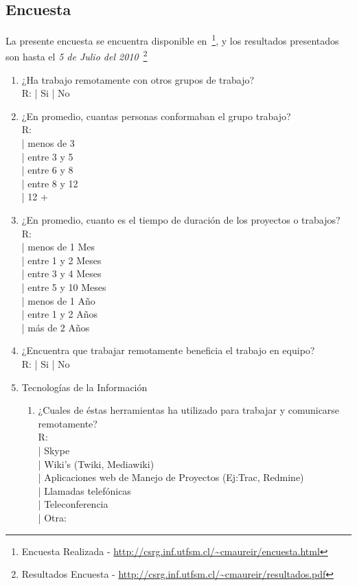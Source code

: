 \subsection{Encuesta}
La presente encuesta se encuentra disponible en~\footnote{Encuesta Realizada - \url{http://csrg.inf.utfsm.cl/~cmaureir/encuesta.html}},
y los resultados presentados son hasta el \emph{5 de Julio del 2010}~\footnote{Resultados Encuesta - \url{http://csrg.inf.utfsm.cl/~cmaureir/resultados.pdf}}
\begin{enumerate}
    \item ¿Ha trabajo remotamente con otros grupos de trabajo?\\
        R: | Si | No
    \item ¿En promedio, cuantas personas conformaban el grupo trabajo?\\
        R:\\
            | menos de 3\\
            | entre 3 y 5\\
            | entre 6 y 8\\
            | entre 8 y 12\\
            | 12 +
    \item ¿En promedio, cuanto es el tiempo de duración de los
    proyectos o trabajos?\\
        R:\\
            | menos de 1 Mes\\
            | entre 1 y 2 Meses\\
            | entre 3 y 4 Meses\\
            | entre 5 y 10 Meses\\
            | menos de 1 Año\\
            | entre 1 y 2 Años\\
            | más de 2 Años
    \item ¿Encuentra que trabajar remotamente beneficia el trabajo en
        equipo?\\
        R: | Si | No
    \item Tecnologías de la Información
    \begin{enumerate}
        \item ¿Cuales de éstas herramientas ha utilizado para trabajar y
            comunicarse remotamente?\\
        R:\\
           | Skype\\
           | Wiki's (Twiki, Mediawiki)\\
           | Aplicaciones web de Manejo de Proyectos (Ej:Trac, Redmine)\\
           | Llamadas telefónicas\\
           | Teleconferencia\\
           | Otra:


\end{enumerate}
\end{enumerate}
